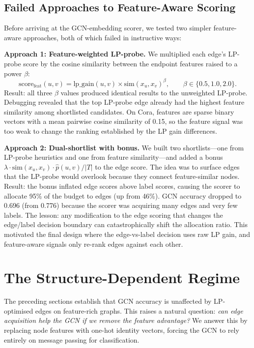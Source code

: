 \documentclass[12pt,a4paper,oneside]{report}
\begin{document}
\subsection{Failed Approaches to Feature-Aware Scoring}

Before arriving at the GCN-embedding scorer, we tested two simpler feature-aware approaches, both of which failed in instructive ways:

\textbf{Approach 1: Feature-weighted LP-probe.} We multiplied each edge's LP-probe score by the cosine similarity between the endpoint features raised to a power $\beta$:
\begin{equation}
    \text{score}_{\text{feat}}(u,v) = \text{lp\_gain}(u,v) \times \text{sim}(x_u, x_v)^\beta, \qquad \beta \in \{0.5, 1.0, 2.0\}.
\end{equation}
Result: all three $\beta$ values produced identical results to the unweighted LP-probe. Debugging revealed that the top LP-probe edge already had the highest feature similarity among shortlisted candidates. On Cora, features are sparse binary vectors with a mean pairwise cosine similarity of 0.15, so the feature signal was too weak to change the ranking established by the LP gain differences.

\textbf{Approach 2: Dual-shortlist with bonus.} We built two shortlists---one from LP-probe heuristics and one from feature similarity---and added a bonus $\lambda \cdot \text{sim}(x_u, x_v) \cdot \hat{p}(u,v) / |T|$ to the edge score. The idea was to surface edges that the LP-probe would overlook because they connect feature-similar nodes. Result: the bonus inflated edge scores above label scores, causing the scorer to allocate 95\% of the budget to edges (up from 46\%). GCN accuracy dropped to 0.696 (from 0.776) because the scorer was acquiring many edges and very few labels. The lesson: any modification to the edge scoring that changes the edge/label decision boundary can catastrophically shift the allocation ratio. This motivated the final design where the edge-vs-label decision uses raw LP gain, and feature-aware signals only re-rank edges against each other.

\section{The Structure-Dependent Regime}
\label{sec:struct_regime}

The preceding sections establish that GCN accuracy is unaffected by LP-optimised edges on feature-rich graphs. This raises a natural question: \emph{can edge acquisition help the GCN if we remove the feature advantage?} We answer this by replacing node features with one-hot identity vectors, forcing the GCN to rely entirely on message passing for classification.
\end{document}

